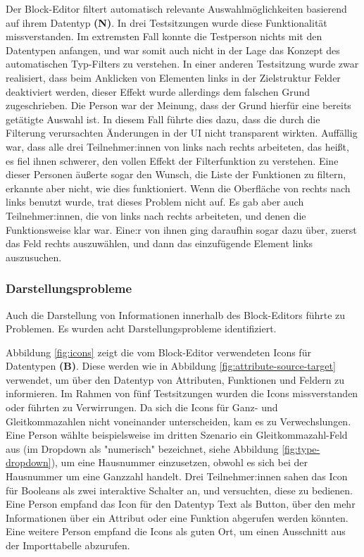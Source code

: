 Der Block-Editor filtert automatisch relevante Auswahlmöglichkeiten basierend auf ihrem Datentyp \textbf{(N)}. In drei Testsitzungen wurde diese Funktionalität missverstanden. Im extremsten Fall konnte die Testperson nichts mit den Datentypen anfangen, und war somit auch nicht in der Lage das Konzept des automatischen Typ-Filters zu verstehen. In einer anderen Testsitzung wurde zwar realisiert, dass beim Anklicken von Elementen links in der Zielstruktur Felder deaktiviert werden, dieser Effekt wurde allerdings dem falschen Grund zugeschrieben. Die Person war der Meinung, dass der Grund hierfür eine bereits getätigte Auswahl ist. In diesem Fall führte dies dazu, dass die durch die Filterung verursachten Änderungen in der UI nicht transparent wirkten. Auffällig war, dass alle drei Teilnehmer:innen von links nach rechts arbeiteten, das heißt, es fiel ihnen schwerer, den vollen Effekt der Filterfunktion zu verstehen. Eine dieser Personen äußerte sogar den Wunsch, die Liste der Funktionen zu filtern, erkannte aber nicht, wie dies funktioniert. Wenn die Oberfläche von rechts nach links benutzt wurde, trat dieses Problem nicht auf. Es gab aber auch Teilnehmer:innen, die von links nach rechts arbeiteten, und denen die Funktionsweise klar war. Eine:r von ihnen ging daraufhin sogar dazu über, zuerst das Feld rechts auszuwählen, und dann das einzufügende Element links auszusuchen.

\subsubsection{Darstellungsprobleme}

Auch die Darstellung von Informationen innerhalb des Block-Editors führte zu Problemen. Es wurden acht Darstellungsprobleme identifiziert.

Abbildung \ref{fig:icons} zeigt die vom Block-Editor verwendeten Icons für Datentypen \textbf{(B)}. Diese werden wie in Abbildung \ref{fig:attribute-source-target} verwendet, um über den Datentyp von Attributen, Funktionen und Feldern zu informieren. Im Rahmen von fünf Testsitzungen wurden die Icons missverstanden oder führten zu Verwirrungen. Da sich die Icons für Ganz- und Gleitkommazahlen nicht voneinander unterscheiden, kam es zu Verwechslungen. Eine Person wählte beispielsweise im dritten Szenario ein Gleitkommazahl-Feld aus (im Dropdown als "numerisch" bezeichnet, siehe Abbildung \ref{fig:type-dropdown}), um eine Hausnummer einzusetzen, obwohl es sich bei der Hausnummer um eine Ganzzahl handelt.  Drei Teilnehmer:innen sahen das Icon für Booleans als zwei interaktive Schalter an, und versuchten, diese zu bedienen. Eine Person empfand das Icon für den Datentyp Text als Button, über den mehr Informationen über ein Attribut oder eine Funktion abgerufen werden könnten. Eine weitere Person empfand die Icons als guten Ort, um einen Ausschnitt aus der Importtabelle abzurufen.


